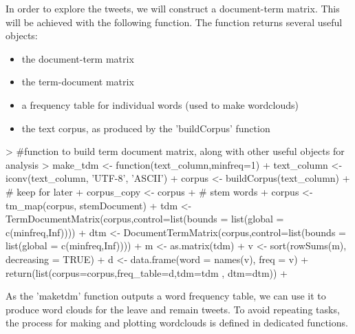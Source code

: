 \documentclass[10pt]{article}
\begin{document}
\hspace{1cm} 
In order to explore the tweets, we will construct a document-term matrix. This will be achieved with the following function. The function returns several useful objects:
\begin{itemize}
  \item the document-term matrix
  \item the term-document matrix
  \item a frequency table for individual words (used to make wordclouds)
  \item the text corpus, as produced by the 'buildCorpus' function
\end{itemize}
\hspace{1cm} 
\begin{Schunk}
\begin{Sinput}
> #function to build term document matrix, along with other useful objects for analysis
> make_tdm <- function(text_column,minfreq=1){
+   text_column <- iconv(text_column, 'UTF-8', 'ASCII')
+   corpus <- buildCorpus(text_column)
+   # keep for later
+   corpus_copy <- corpus
+   # stem words
+   corpus <- tm_map(corpus, stemDocument)
+   tdm <- TermDocumentMatrix(corpus,control=list(bounds = list(global = c(minfreq,Inf)))) 
+   dtm <- DocumentTermMatrix(corpus,control=list(bounds = list(global = c(minfreq,Inf)))) 
+   m <- as.matrix(tdm)
+   v <- sort(rowSums(m), decreasing = TRUE)
+   d <- data.frame(word = names(v), freq = v)
+   return(list(corpus=corpus,freq_table=d,tdm=tdm , dtm=dtm))
+ }
\end{Sinput}
\end{Schunk}
\hspace{1cm} 
As the 'maketdm' function outputs a word frequency table, we can use it to produce word clouds for the leave and remain tweets. To avoid repeating tasks, the process for making and plotting wordclouds is defined in dedicated functions.
\hspace{1cm} 
\begin{Schunk}
\end{Schunk}
\end{document}
